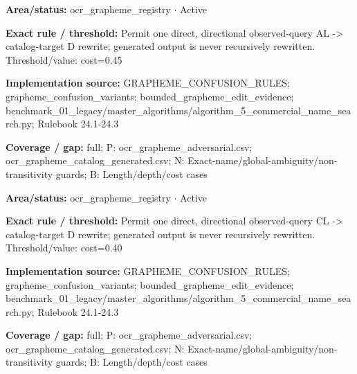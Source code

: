 \begin{tcolorbox}[enhanced,breakable,colback=white,colframe=Muted!45,boxrule=0.45pt,arc=1.5pt,left=6pt,right=6pt,top=5pt,bottom=5pt,title={\texttt{OCR-GRAPHEME-AL-TO-D}},title after break={\texttt{OCR-GRAPHEME-AL-TO-D}\ (continued)},fonttitle=\headingfont\bfseries\color{Navy},coltitle=Navy]
\textbf{Area/status:} ocr\_\allowbreak{}grapheme\_\allowbreak{}registry $\boldsymbol{\cdot}$ Active\par
\smallskip
\textbf{Exact rule / threshold:} Permit one direct, directional observed-query AL -> catalog-target D rewrite; generated output is never recursively rewritten. Threshold/\allowbreak{}value: cost=0.45\par
\smallskip
\textbf{Implementation source:} GRAPHEME\_\allowbreak{}CONFUSION\_\allowbreak{}RULES; grapheme\_\allowbreak{}confusion\_\allowbreak{}variants; bounded\_\allowbreak{}grapheme\_\allowbreak{}edit\_\allowbreak{}evidence; benchmark\_\allowbreak{}01\_\allowbreak{}legacy/\allowbreak{}master\_\allowbreak{}algorithms/\allowbreak{}algorithm\_\allowbreak{}5\_\allowbreak{}commercial\_\allowbreak{}name\_\allowbreak{}search.py; Rulebook 24.1-24.3\par
\smallskip
\textbf{Coverage / gap:} full; P: ocr\_\allowbreak{}grapheme\_\allowbreak{}adversarial.csv; ocr\_\allowbreak{}grapheme\_\allowbreak{}catalog\_\allowbreak{}generated.csv; N: Exact-name/\allowbreak{}global-ambiguity/\allowbreak{}non-transitivity guards; B: Length/\allowbreak{}depth/\allowbreak{}cost cases
\end{tcolorbox}
\begin{tcolorbox}[enhanced,breakable,colback=white,colframe=Muted!45,boxrule=0.45pt,arc=1.5pt,left=6pt,right=6pt,top=5pt,bottom=5pt,title={\texttt{OCR-GRAPHEME-CL-TO-D}},title after break={\texttt{OCR-GRAPHEME-CL-TO-D}\ (continued)},fonttitle=\headingfont\bfseries\color{Navy},coltitle=Navy]
\textbf{Area/status:} ocr\_\allowbreak{}grapheme\_\allowbreak{}registry $\boldsymbol{\cdot}$ Active\par
\smallskip
\textbf{Exact rule / threshold:} Permit one direct, directional observed-query CL -> catalog-target D rewrite; generated output is never recursively rewritten. Threshold/\allowbreak{}value: cost=0.40\par
\smallskip
\textbf{Implementation source:} GRAPHEME\_\allowbreak{}CONFUSION\_\allowbreak{}RULES; grapheme\_\allowbreak{}confusion\_\allowbreak{}variants; bounded\_\allowbreak{}grapheme\_\allowbreak{}edit\_\allowbreak{}evidence; benchmark\_\allowbreak{}01\_\allowbreak{}legacy/\allowbreak{}master\_\allowbreak{}algorithms/\allowbreak{}algorithm\_\allowbreak{}5\_\allowbreak{}commercial\_\allowbreak{}name\_\allowbreak{}search.py; Rulebook 24.1-24.3\par
\smallskip
\textbf{Coverage / gap:} full; P: ocr\_\allowbreak{}grapheme\_\allowbreak{}adversarial.csv; ocr\_\allowbreak{}grapheme\_\allowbreak{}catalog\_\allowbreak{}generated.csv; N: Exact-name/\allowbreak{}global-ambiguity/\allowbreak{}non-transitivity guards; B: Length/\allowbreak{}depth/\allowbreak{}cost cases
\end{tcolorbox}
